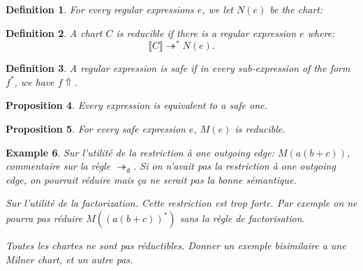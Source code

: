 \documentclass{article}
\newtheorem{definition}{Definition}[section]
\newtheorem{proposition}[definition]{Proposition}
\newtheorem{example}[definition]{Example}
\begin{document}
\begin{definition}
For every regular expressions $e$, we let ${N}(e)$ be the chart:
\begin{center}
    \end{center}
\end{definition}

\begin{definition}
    A chart $C$ is \emph{reducible} if there is a regular expression $e$ where:
     $$\llbracket C\rrbracket \twoheadrightarrow^* N(e).$$
\end{definition}

\begin{definition}
    A regular expression is \emph{safe} if in every sub-expression of the form $f^*$, we have $f\Uparrow$.
\end{definition}

\begin{proposition}
  Every expression is equivalent to a safe one.
    ~\label{prop:every-expression-is-equivalent-to-a-safe-one}
\end{proposition}

\begin{proposition} For every safe expression $e$, $M(e)$ is reducible.
    ~\label{prop:Milner-is-reducible}
\end{proposition}

\begin{example}
    Sur l'utilité de la restriction à one outgoing edge: $M(a(b+c))$, commentaire sur la règle $\twoheadrightarrow_{\mathsf{d}}$.
     Si on n'avait pas la restriction à one outgoing edge, on pourrait réduire mais ça ne serait pas 
     la bonne sémantique.

    Sur l'utilité de la factorization. Cette restriction est trop forte. Par exemple on ne pourra pas
    réduire $M((a(b+c))^*)$ sans la règle de factorisation.

    Toutes les chartes ne sont pas réductibles. Donner un exemple bisimilaire a une Milner chart, et un autre pas.
\end{example}
\end{document}
